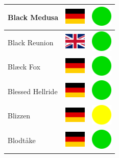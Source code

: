 \documentclass[12pt, a4paper, twoside]{report}
\begin{document}
\begin{center}
\begin{longtable}{|p{5cm}|p{2cm}|p{2cm}|}
Black Medusa & \includegraphics[width=1cm]{4x3/de} & \includegraphics[width=1cm]{likes/y} \\ \hline
Black Reunion & \includegraphics[width=1cm]{4x3/gb} & \includegraphics[width=1cm]{likes/y} \\ \hline
Blæck Fox & \includegraphics[width=1cm]{4x3/de} & \includegraphics[width=1cm]{likes/y} \\ \hline
Blessed Hellride & \includegraphics[width=1cm]{4x3/de} & \includegraphics[width=1cm]{likes/y} \\ \hline
Blizzen & \includegraphics[width=1cm]{4x3/de} & \includegraphics[width=1cm]{likes/m} \\ \hline
Blodtåke & \includegraphics[width=1cm]{4x3/de} & \includegraphics[width=1cm]{likes/y} \\ \hline

\end{longtable}
\end{center}
\end{document}
